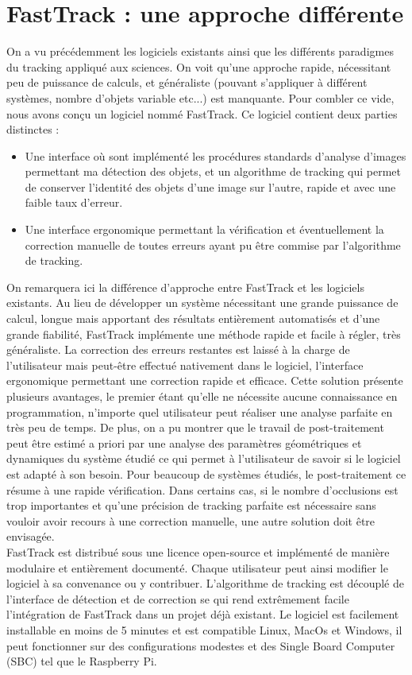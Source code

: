 	\section{FastTrack : une approche différente}
  On a vu précédemment les logiciels existants ainsi que les différents paradigmes du tracking appliqué aux sciences. On voit qu'une approche rapide, nécessitant peu de puissance de calculs, et généraliste (pouvant s'appliquer à différent systèmes, nombre d'objets variable etc...) est manquante.
	Pour combler ce vide, nous avons conçu un logiciel nommé FastTrack. Ce logiciel contient deux parties distinctes :
	\begin{itemize}
		\item Une interface où sont implémenté les procédures standards d'analyse d'images permettant ma détection des objets, et un algorithme de tracking qui permet de conserver l'identité des objets d'une image sur l'autre, rapide et avec une faible taux d'erreur.
		\item Une interface ergonomique permettant la vérification et éventuellement la correction manuelle de toutes erreurs ayant pu être commise par l’algorithme de tracking.
	\end{itemize}
	On remarquera ici la différence d'approche entre FastTrack et les logiciels existants. Au lieu de développer un système nécessitant une grande puissance de calcul, longue mais apportant des résultats entièrement automatisés et d'une grande fiabilité, FastTrack implémente une méthode rapide et facile à régler, très généraliste. La correction des erreurs restantes est laissé à la charge de l'utilisateur mais peut-être effectué nativement dans le logiciel, l'interface ergonomique permettant une correction rapide et efficace. 
	Cette solution présente plusieurs avantages, le premier étant qu'elle ne nécessite aucune connaissance en programmation, n'importe quel utilisateur peut réaliser une analyse parfaite en très peu de temps. De plus, on a pu montrer que le travail de post-traitement peut être estimé a priori par une analyse des paramètres géométriques et dynamiques du système étudié ce qui permet à l'utilisateur de savoir si le logiciel est adapté à son besoin. Pour beaucoup de systèmes étudiés,  le post-traitement ce résume à une rapide vérification. Dans certains cas, si le nombre d'occlusions est trop importantes et qu'une précision de tracking parfaite est nécessaire sans vouloir avoir recours à une correction manuelle, une autre solution doit être envisagée.\\
	FastTrack est distribué sous une licence open-source et implémenté de manière modulaire et entièrement documenté. Chaque utilisateur peut ainsi modifier le logiciel à sa convenance ou y contribuer. L'algorithme de tracking est découplé de l'interface de détection et de correction se qui rend extrêmement facile l'intégration de FastTrack dans un projet déjà existant. Le logiciel est facilement installable en moins de 5 minutes et est compatible Linux, MacOs et Windows, il peut fonctionner sur des configurations modestes et des Single Board Computer (SBC) tel que le Raspberry Pi.


